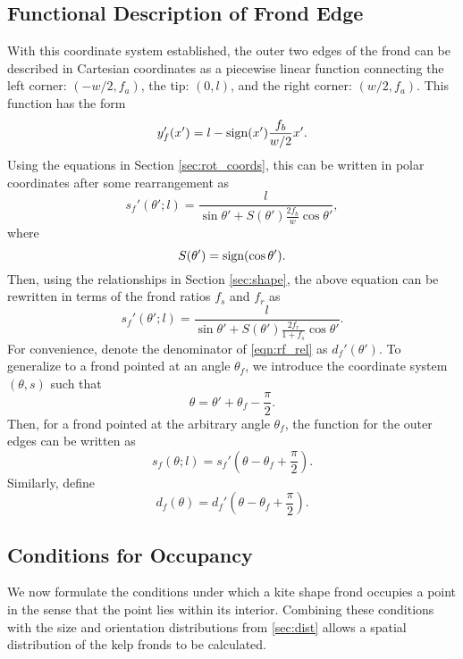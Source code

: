 \subsection{Functional Description of Frond Edge}
With this coordinate system established, the outer two edges of the frond can be described in Cartesian coordinates as a piecewise linear function connecting the left corner: $(-w/2,f_a)$, the tip: $(0,l)$, and the right corner: $(w/2,f_a)$.
This function has the form
\begin{equation*}
	y'_f(x') = l-\mbox{sign}(x')\frac{f_b}{w/2}x'.
\end{equation*}
Using the equations in Section \ref{sec:rot_coords}, this can be written in polar coordinates after some rearrangement as
\begin{equation*}
	s_f'(\theta';l) = \frac{l}{\sin\theta' + S(\theta')\frac{2f_b}{w}\cos\theta'},
\end{equation*}
where
\begin{equation*}
	S(\theta') = \mbox{sign}(\cos\theta').
\end{equation*}
Then, using the relationships in Section \ref{sec:shape}, the above equation can be rewritten in terms of the frond ratios $f_s$ and $f_r$ as
\begin{equation}
	\label{eqn:rf_rel}
	s_f'(\theta';l) = \frac{l}{\sin\theta' + S(\theta')\frac{2f_r}{1+f_s}\cos\theta'}.
\end{equation}
For convenience, denote the denominator of \eqref{eqn:rf_rel} as $d_f'(\theta')$.
To generalize to a frond pointed at an angle $\theta_f$, we introduce the coordinate system $(\theta,s)$ such that
\begin{equation*}
	\theta = \theta' + \theta_f - \frac{\pi}{2}.
\end{equation*}
Then, for a frond pointed at the arbitrary angle $\theta_f$, the function for the outer edges can be written as
\begin{equation}
	\label{eqn:rf_abs}
	s_f(\theta;l) = s_f'\left(\theta - \theta_f + \frac{\pi}{2} \right).
\end{equation}
Similarly, define
\begin{equation}
	d_f(\theta) = d_f'\left(\theta - \theta_f + \frac{\pi}{2} \right).
\end{equation}

\subsection{Conditions for Occupancy}
We now formulate the conditions under which a kite shape frond occupies a point
in the sense that the point lies within its interior.
Combining these conditions with the size and orientation distributions from \ref{sec:dist}
allows a spatial distribution of the kelp fronds to be calculated.

